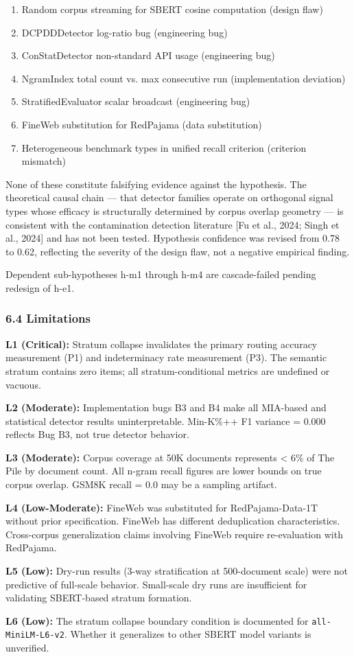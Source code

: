 \begin{enumerate}
\item Random corpus streaming for SBERT cosine computation (design flaw)
\item DCPDDDetector log-ratio bug (engineering bug)
\item ConStatDetector non-standard API usage (engineering bug)
\item NgramIndex total count vs. max consecutive run (implementation deviation)
\item StratifiedEvaluator scalar broadcast (engineering bug)
\item FineWeb substitution for RedPajama (data substitution)
\item Heterogeneous benchmark types in unified recall criterion (criterion mismatch)
\end{enumerate}

None of these constitute falsifying evidence against the hypothesis. The theoretical causal chain — that detector families operate on orthogonal signal types whose efficacy is structurally determined by corpus overlap geometry — is consistent with the contamination detection literature [Fu et al., 2024; Singh et al., 2024] and has not been tested. Hypothesis confidence was revised from 0.78 to 0.62, reflecting the severity of the design flaw, not a negative empirical finding.

Dependent sub-hypotheses h-m1 through h-m4 are cascade-failed pending redesign of h-e1.

\subsubsection{6.4 Limitations}

\textbf{L1 (Critical):} Stratum collapse invalidates the primary routing accuracy measurement (P1) and indeterminacy rate measurement (P3). The semantic stratum contains zero items; all stratum-conditional metrics are undefined or vacuous.

\textbf{L2 (Moderate):} Implementation bugs B3 and B4 make all MIA-based and statistical detector results uninterpretable. Min-K\%++ F1 variance = 0.000 reflects Bug B3, not true detector behavior.

\textbf{L3 (Moderate):} Corpus coverage at 50K documents represents < 6\% of The Pile by document count. All n-gram recall figures are lower bounds on true corpus overlap. GSM8K recall = 0.0 may be a sampling artifact.

\textbf{L4 (Low-Moderate):} FineWeb was substituted for RedPajama-Data-1T without prior specification. FineWeb has different deduplication characteristics. Cross-corpus generalization claims involving FineWeb require re-evaluation with RedPajama.

\textbf{L5 (Low):} Dry-run results (3-way stratification at 500-document scale) were not predictive of full-scale behavior. Small-scale dry runs are insufficient for validating SBERT-based stratum formation.

\textbf{L6 (Low):} The stratum collapse boundary condition is documented for \texttt{all-MiniLM-L6-v2}. Whether it generalizes to other SBERT model variants is unverified.

